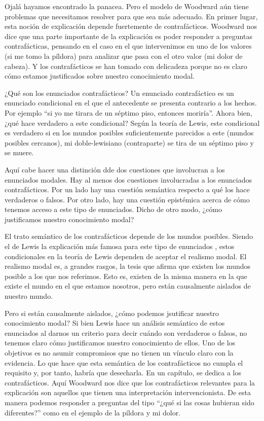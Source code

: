 {Ojalá hayamos encontrado la panacea. Pero el modelo de Woodward aún tiene problemas que necesitamos resolver para que sea más adecuado. En primer lugar, esta noción de explicación depende fuertemente de contrafácticos. Woodward nos dice que una parte importante de la explicación es poder responder a preguntas contrafácticas, pensando en el caso en el que intervenimos en uno de los valores (si me tomo la píldora) para analizar que pasa con el otro valor (mi dolor de cabeza). Y los contrafácticos se han tomado con delicadeza porque no es claro cómo estamos justificados sobre nuestro conocimiento modal.

¿Qué son los enunciados contrafácticos? Un enunciado contrafáctico es un enunciado condicional en el que el antecedente se presenta contrario a los hechos. Por ejemplo ``si yo me tirara de un séptimo piso, entonces moriría''. Ahora bien, ¿qué hace verdadero a este condicional? Según la teoría de Lewis, este condicional es verdadero si en los mundos posibles suficientemente parecidos a este (mundos posibles cercanos), mi doble-lewisiano (contraparte) se tira de un séptimo piso y se muere.

Aquí cabe hacer una distinción dde dos cuestiones que involucran a los enunciados modales. Hay al menos dos cuestiones involucradas a los enunciados contrafácticos. Por un lado hay una cuestión semántica respecto a qué los hace verdaderos o falsos. Por otro lado, hay una cuestión epistémica acerca de cómo tenemos acceso a este tipo de enunciados. Dicho de otro modo, ¿cómo justificamos nuestro conocimiento modal?

El trato semántico de los contrafácticos depende de los mundos posibles. Siendo el de Lewis la explicación más famosa para este tipo de enunciados \citeyear{Lewis1973}, estos condicionales en la teoría de Lewis dependen de aceptar el realismo modal. El realismo modal es, a grandes rasgos, la tesis que afirma que existen los mundos posible a los que nos referimos. Esto es, existen de la misma manera en la que existe el mundo en el que estamos nosotros, pero están causalmente aislados de nuestro mundo.

Pero si están causalmente aislados, ¿cómo podemos jsutificar nuestro conocimiento modal? Si bien Lewis hace un análisis semántico de estos enunciados al darnos un criterio para decir cuándo son verdaderos o falsos, no tenemos claro cómo justificamos nuestro conocimiento de ellos. Uno de los objetivos es no asumir compromisos que no tienen un vínculo claro con la evidencia. Lo que hace que esta semántica de los contrafácticos no cumpla el requisito y, por tanto, habría que desecharla. En un capítulo, \cite[cap. 5]{Woodward2003} se  dedica a los contrafácticos. Aquí Woodward nos dice que los contrafácticos relevantes para la explicación son aquellos que tienen una interpretación intervencionista. De esta manera podemos responder a preguntas del tipo ``¿qué si las cosas hubieran sido diferentes?'' como en el ejemplo de la píldora y mi dolor.

}
